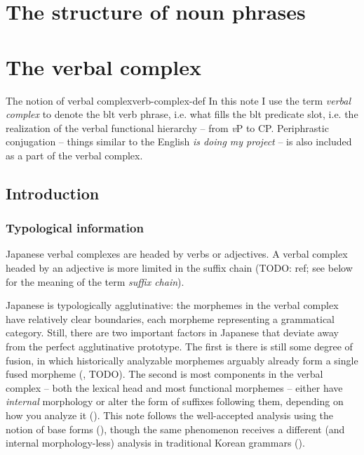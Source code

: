 \documentclass[UTF8, a4paper, oneside, scheme=plain]{ctexrep}
\newcommand*{\term}[1]{\emph{#1}}
\newcommand{\corpus}[1]{\emph{#1}}
\newcommand{\vP}{\textit{v}P}
\begin{document}
\chapter{The structure of noun phrases}

\chapter{The verbal complex}\label{chap:verb-complex}

\begin{theorybox}{The notion of verbal complex}{verb-complex-def}
    In this note I use the term \term{verbal complex} to denote the \ac{blt} verb phrase,
    i.e. what fills the \ac{blt} predicate slot,
    i.e. the realization of the verbal functional hierarchy -- from \vP{} to CP.
    Periphrastic conjugation -- things similar to the English \corpus{is doing my project} -- 
    is also included as a part of the verbal complex.
\end{theorybox}

\section{Introduction}

\subsection{Typological information}

Japanese verbal complexes are headed by verbs or adjectives.
A verbal complex headed by an adjective is more limited 
in the suffix chain (TODO: ref; see below for the meaning of the term \term{suffix chain}).

Japanese is typologically agglutinative:
the morphemes in the verbal complex have relatively clear boundaries,
each morpheme representing a grammatical category.
Still, there are two important factors in Japanese that deviate away 
from the perfect agglutinative prototype.
The first is there is still some degree of fusion, 
in which historically analyzable morphemes arguably already form a single fused morpheme 
(, TODO).
The second is most components in the verbal complex 
-- both the lexical head and most functional morphemes --
either have \emph{internal} morphology or alter the form of suffixes following them,
depending on how you analyze it ().
This note follows the well-accepted analysis using the notion of base forms (),
though the same phenomenon receives a different (and internal morphology-less) analysis 
in traditional Korean grammars ().
\end{document}
